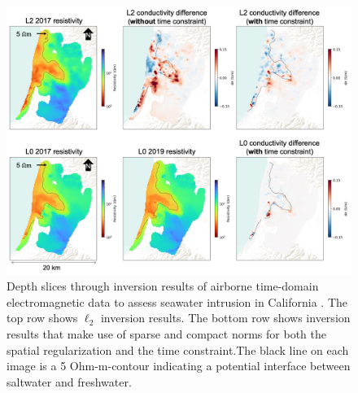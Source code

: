 \begin{figure}[!htb]
    \begin{center}
    \includegraphics[width=1\textwidth]{figures/time_lapse_resistivity.png}
    \end{center}
\caption{
    Depth slices through inversion results of airborne time-domain electromagnetic data to assess seawater intrusion in California \citep{kang_time-lapse_2022}. The top row shows $\ell_2$ inversion results. The bottom row shows inversion results that make use of sparse and compact norms for both the spatial regularization and the time constraint.The black line on each image is a 5 Ohm-m-contour indicating a potential interface between saltwater and freshwater.
}
\label{fig:sparse-compact-norms-aem}
\end{figure}
